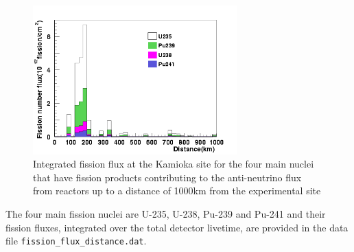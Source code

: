\documentclass[a4paper,fleqn,12pt]{article}
\begin{document}
\begin{figure}[H]
\centering
\includegraphics[width=0.7\textwidth]{fig/calc_by_run_time_distance_graph.png}
\caption{Integrated fission flux at the Kamioka site for the four main nuclei that have fission products contributing to the anti-neutrino flux from reactors up to a distance of 1000km from the experimental site}
\label{fig:calc_by_run_time_distance_graph}
\end{figure}

The four main fission nuclei are U-235, U-238, Pu-239 and Pu-241 and their fission fluxes, integrated over the total detector livetime, are provided in the data file \texttt{fission\_flux\_distance.dat}.
\end{document}
